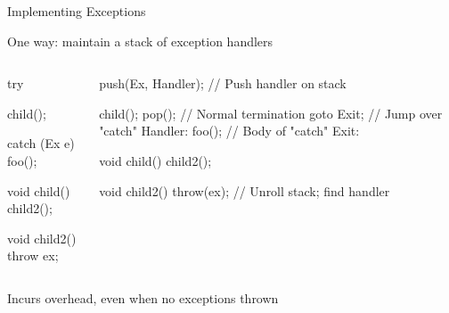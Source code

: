 \documentclass{plt}
\begin{document}
\begin{frame}[fragile]{Implementing Exceptions}

One way: maintain a stack of exception handlers

\begin{columns}
\begin{column}{0.25\textwidth}
\begin{cpp}
try {

  child();


} catch (Ex e) {
  foo();
}

void child() {
  child2();
}

void child2() {
  throw ex;
}
\end{cpp}
\end{column}
\begin{column}{0.75\textwidth}
\begin{cpp}
  push(Ex, Handler); // Push handler on stack

  child();
  pop();             // Normal termination
  goto Exit;         // Jump over "catch"
Handler:
  foo();             // Body of "catch"
Exit:

void child() {
  child2();
}

void child2() {
  throw(ex);       // Unroll stack; find handler
}
\end{cpp}
\end{column}
\end{columns}

Incurs overhead, even when no exceptions thrown
\end{frame}
\end{document}
